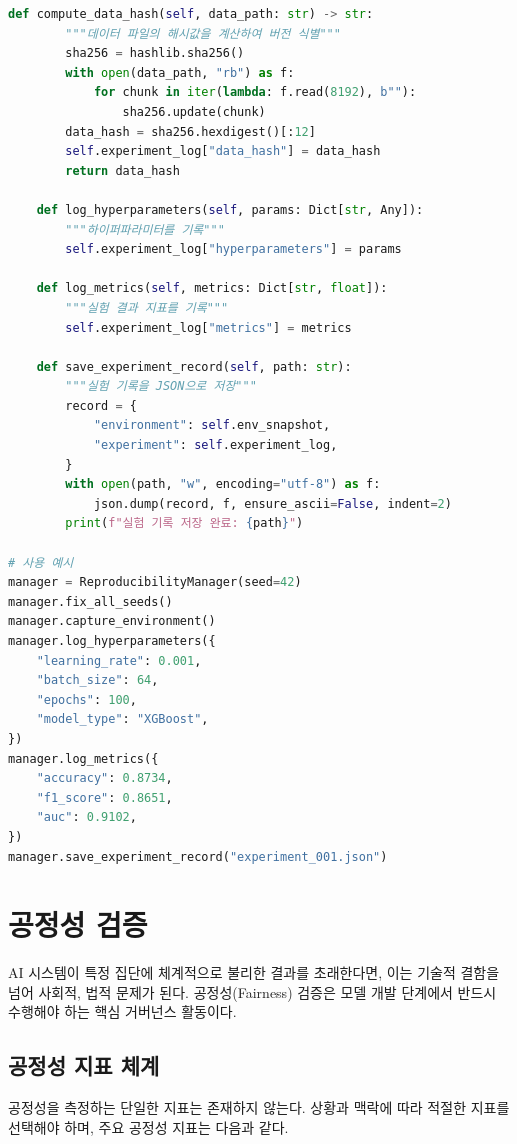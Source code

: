 \begin{lstlisting}[language=Python, caption={재현성 보장 실험 관리자}, label={lst:reproducibility_manager}]
    def compute_data_hash(self, data_path: str) -> str:
        """데이터 파일의 해시값을 계산하여 버전 식별"""
        sha256 = hashlib.sha256()
        with open(data_path, "rb") as f:
            for chunk in iter(lambda: f.read(8192), b""):
                sha256.update(chunk)
        data_hash = sha256.hexdigest()[:12]
        self.experiment_log["data_hash"] = data_hash
        return data_hash

    def log_hyperparameters(self, params: Dict[str, Any]):
        """하이퍼파라미터를 기록"""
        self.experiment_log["hyperparameters"] = params

    def log_metrics(self, metrics: Dict[str, float]):
        """실험 결과 지표를 기록"""
        self.experiment_log["metrics"] = metrics

    def save_experiment_record(self, path: str):
        """실험 기록을 JSON으로 저장"""
        record = {
            "environment": self.env_snapshot,
            "experiment": self.experiment_log,
        }
        with open(path, "w", encoding="utf-8") as f:
            json.dump(record, f, ensure_ascii=False, indent=2)
        print(f"실험 기록 저장 완료: {path}")

# 사용 예시
manager = ReproducibilityManager(seed=42)
manager.fix_all_seeds()
manager.capture_environment()
manager.log_hyperparameters({
    "learning_rate": 0.001,
    "batch_size": 64,
    "epochs": 100,
    "model_type": "XGBoost",
})
manager.log_metrics({
    "accuracy": 0.8734,
    "f1_score": 0.8651,
    "auc": 0.9102,
})
manager.save_experiment_record("experiment_001.json")
\end{lstlisting}

\section{공정성 검증}
\label{sec:10.3}

AI 시스템이 특정 집단에 체계적으로 불리한 결과를 초래한다면, 이는 기술적 결함을 넘어 사회적, 법적 문제가 된다. 공정성(Fairness) 검증은 모델 개발 단계에서 반드시 수행해야 하는 핵심 거버넌스 활동이다.

\subsection{공정성 지표 체계}
\label{sec:10.3.1}

공정성을 측정하는 단일한 지표는 존재하지 않는다. 상황과 맥락에 따라 적절한 지표를 선택해야 하며, 주요 공정성 지표는 다음과 같다.

